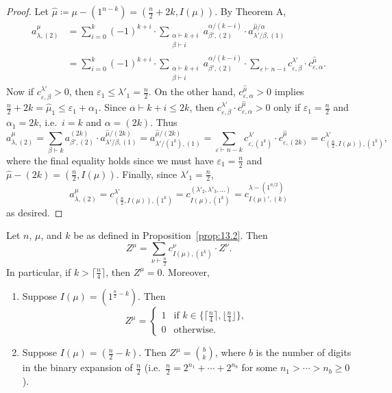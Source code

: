 \documentclass[ALCO, Unicode]{cedram}
\begin{document}
\begin{proof}
	Let $\hat{\mu}\coloneqq \mu-(1^{n-k})=(\frac{n}{2}+2k,I(\mu))$. By Theorem A,
	\begin{align*} a^\mu_{\lambda,(2)} &= \sum_{i=0}^k (-1)^{k+i}\cdot \sum_{\substack{\alpha\vdash k+i\\\beta\vdash i}} a^{\alpha/(k-i)}_{\beta',(2)}\cdot a^{\hat{\mu}/\alpha}_{\lambda'/\beta,(1)}\\& = \sum_{i=0}^k (-1)^{k+i}\cdot \sum_{\substack{\alpha\vdash k+i\\\beta\vdash i}} a^{\alpha/(k-i)}_{\beta',(2)}\cdot\sum_{\varepsilon\vdash n-i}c^{\lambda'}_{\varepsilon,\beta}\cdot c^{\hat{\mu}}_{\varepsilon,\alpha}. \end{align*}
	Now if $c^{\lambda'}_{\varepsilon,\beta}>0$, then $\varepsilon_1\le\lambda'_1=\frac{n}{2}$. On the other hand, $c^{\hat{\mu}}_{\varepsilon,\alpha}>0$ implies $\frac{n}{2}+2k=\hat{\mu}_1\le\varepsilon_1+\alpha_1$. Since $\alpha\vdash k+i\le 2k$, then $c^{\lambda'}_{\varepsilon,\beta}\cdot c^{\hat{\mu}}_{\varepsilon,\alpha}>0$ only if $\varepsilon_1=\frac{n}{2}$ and $\alpha_1=2k$, i.e.~$i=k$ and $\alpha=(2k)$. Thus
	\[ a^\mu_{\lambda,(2)} = \sum_{\beta\vdash k}a^{(2k)}_{\beta',(2)}\cdot a^{\hat{\mu}/(2k)}_{\lambda'/\beta,(1)} = a^{\hat{\mu}/(2k)}_{\lambda'/(1^k),(1)} = \sum_{\varepsilon\vdash n-k} c^{\lambda'}_{\varepsilon,(1^k)}\cdot c^{\hat{\mu}}_{\varepsilon,(2k)} = c^{\lambda'}_{(\frac{n}{2},I(\mu)),(1^k)}, \]
	where the final equality holds since we must have $\varepsilon_1=\frac{n}{2}$ and $\hat{\mu}-(2k)=(\frac{n}{2},I(\mu))$. Finally, since $\lambda'_1=\frac{n}{2}$,
	\[ a^\mu_{\lambda,(2)} = c^{\lambda'}_{(\frac{n}{2},I(\mu)),(1^k)} = c^{(\lambda'_2,\lambda'_3,\dotsc)}_{I(\mu),(1^k)} = c^{\lambda-(1^{n/2})}_{I(\mu)',(k)} \]
	as desired.
\end{proof}

\begin{corollary}\label{cor:13.3,4,5}
	Let $n$, $\mu$, and $k$ be as defined in Proposition~\ref{prop:13.2}. Then
	\[ Z^\mu=\sum_{\nu\vdash \frac{n}{2}} c^\nu_{I(\mu),(1^k)}\cdot Z^\nu. \]
	In particular, if $k>\lceil\frac{n}{4}\rceil$, then $Z^\mu=0$. Moreover,
	\begin{enumerate}[label=\textup{(\roman*)}]
		\item \label{681} Suppose $I(\mu)=(1^{\frac{n}{2}-k})$. Then
		\[ Z^\mu = \begin{cases}
			1 & \text{if }k\in\{\lceil\frac{n}{4}\rceil,\lfloor\frac{n}{4}\rfloor\},\\ 0 & \text{otherwise}.
		\end{cases}\]
		
		\item \label{682} Suppose $I(\mu)=(\frac{n}{2}-k)$. Then $Z^\mu=\binom{b}{k}$, where $b$ is the number of digits in the binary expansion of $\frac{n}{2}$ \textup{(}i.e.~$\frac{n}{2}=2^{n_1}+\cdots+2^{n_b}$ for some $n_1>\cdots>n_b\ge 0$\textup{)}.
	\end{enumerate}
\end{corollary}
\end{document}

